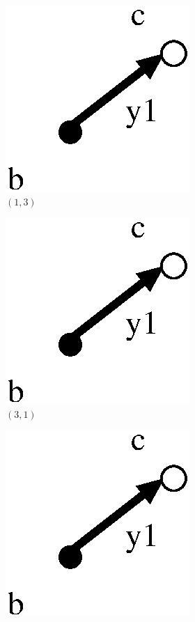 \documentclass[a4paper,12pt]{article}
\numberwithin{equation}{section}
\numberwithin{figure}{section}
\begin{document}
\begin{figure}
\begin{center}




\begin{subfigure}[b]{.13\columnwidth}
\includegraphics[scale=.5]{G2xG2-2.eps}
\caption{$(1,3)$}
\label{fig:G2xG2-2-1}
\end{subfigure}
\hspace{1mm}
\begin{subfigure}[b]{.13\columnwidth}
\includegraphics[scale=.5]{G2xG2-2.eps}
\caption{$(3,1)$}
\label{fig:G2xG2-2-2}
\end{subfigure}
\hspace{1mm}
\begin{subfigure}[b]{.13\columnwidth}
\includegraphics[scale=.5]{G2xG2-2.eps}

\end{subfigure}
\end{center}
\end{figure}
\end{document}
